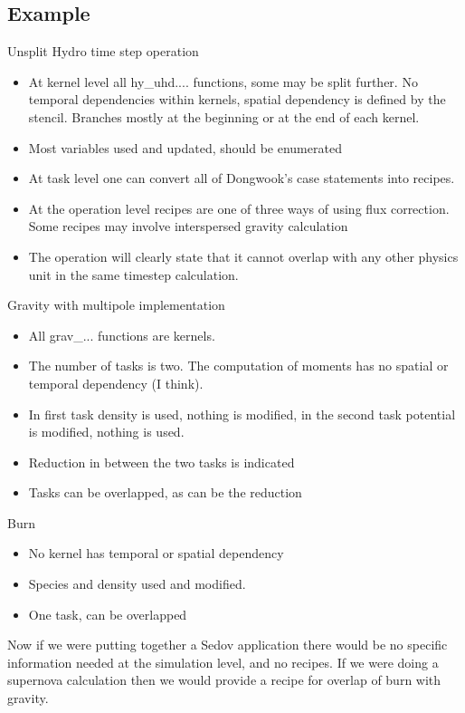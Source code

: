 \documentclass{article}
\begin{document}
\subsection{Example}
Unsplit Hydro time step operation
\begin {itemize}
\item At kernel level all hy\_uhd.... functions, some may be split
  further.  No temporal dependencies within kernels, spatial dependency
  is defined by the stencil. Branches mostly at the beginning or at
  the end of each kernel. 
\item Most variables used and updated, should be enumerated
\item At task level one can convert all of Dongwook's case statements
  into recipes. 
\item At the operation level recipes are one of three ways of using flux
  correction. Some recipes may involve interspersed gravity
  calculation
\item The operation will clearly state that it cannot overlap with any
  other physics unit in the same timestep calculation.
\end{itemize}
Gravity with multipole implementation
\begin{itemize}
\item All grav\_... functions are kernels.
\item The number of tasks is two. The computation of moments has no
  spatial or temporal dependency (I think). 
\item In first task density is used, nothing is modified, in the
  second task potential is modified, nothing is used.
\item Reduction in between the two tasks is indicated
\item Tasks can be overlapped, as can be the reduction
\end{itemize}
Burn
\begin{itemize}
\item No kernel has temporal or spatial dependency
\item Species and density used and modified.
\item One task, can be overlapped
\end{itemize}

Now if we were putting together a Sedov application there would be no
specific information needed at the simulation level, and no
recipes. If we were doing a supernova calculation then we would
provide a recipe for overlap of burn with gravity.
\end{document}
